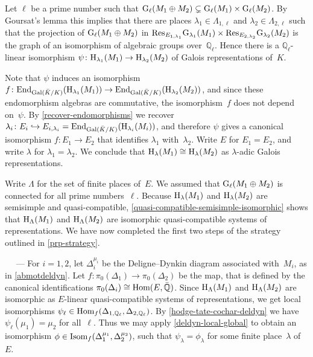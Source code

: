 \documentclass[10pt,twoside,leqno]{article}
\renewcommand{\paragraph}[1]{\par\bigskip\refstepcounter{subsection}%
 {\normalfont\normalsize\scshape\noindent\thesubsection%
 \ifthenelse{\equal{#1}{}}%
 {}%
 {\ \textls{#1.}}%
 \ ---}%
}
\numberwithin{equation}{subsection}
\newcommand{\into}{\hookrightarrow}
\newcommand{\Hom}{\textnormal{Hom}}
\newcommand{\End}{\textnormal{End}}
\newcommand{\Isom}{\textnormal{Isom}}
\newcommand{\QQ}{\mathbb{Q}}
\newcommand{\QQbar}{\bar{\QQ}}
\newcommand{\QQl}{\QQ_{\ell}}
\newcommand{\Gal}{\textnormal{Gal}}
\newcommand{\HH}{\textnormal{H}}
\newcommand{\Hlambda}{\HH_{\lambda}}
\newcommand{\HLambda}{\HH_{\Lambda}}
\newcommand{\GG}{\textnormal{G}}
\newcommand{\Gl}{\GG_{\ell}}
\newcommand{\Res}{\textnormal{Res}}
\begin{document}
Let $\ell$ be a prime number
such that $\Gl(M_1 \oplus M_2) \subsetneq \Gl(M_1) \times \Gl(M_2)$.
By Goursat's lemma this implies that there are
places $\lambda_1 \in \Lambda_{1,\ell}$
and $\lambda_2 \in \Lambda_{2,\ell}$
such that the projection of $\Gl(M_1 \oplus M_2)$ in
$\Res_{E_{1,\lambda_1}} \GG_{\lambda_1}(M_1) \times
\Res_{E_{2,\lambda_2}} \GG_{\lambda_2}(M_2)$
is the graph of an isomorphism of algebraic groups over~$\QQl$.
Hence there is a $\QQl$-linear isomorphism %
$\psi \colon \HH_{\lambda_1}(M_1) \to \HH_{\lambda_2}(M_2)$
of Galois representations of~$K$.

Note that $\psi$ induces an isomorphism
$f \colon \End_{\Gal(\bar{K}/K)}(\HH_{\lambda_1}(M_1)) \to
\End_{\Gal(\bar{K}/K)}(\HH_{\lambda_2}(M_2))$,
and since these endomorphism algebras are commutative,
the isomorphism~$f$ does not depend on~$\psi$.
By \cref{recover-endomorphisms} we recover
$\lambda_i \colon E_i \into E_{i,\lambda_i} =
\End_{\Gal(\bar{K}/K)}(\HH_{\lambda_i}(M_i))$,
and therefore $\psi$ gives a canonical isomorphism
$f \colon E_1 \to E_2$ that identifies $\lambda_1$ with~$\lambda_2$.
Write $E$ for $E_1 = E_2$,
and write $\lambda$ for $\lambda_1 = \lambda_2$.
We conclude that $\Hlambda(M_1) \cong \Hlambda(M_2)$
as $\lambda$-adic Galois representations.

Write $\Lambda$ for the set of finite places of~$E$.
We assumed that $\Gl(M_{1} \oplus M_{2})$
is connected for all prime numbers~$\ell$.
Because $\Hlambda(M_1)$ and $\Hlambda(M_2)$
are semisimple and quasi-compatible,
\cref{quasi-compatible-semisimple-isomorphic}
shows that $\HLambda(M_1)$ and $\HLambda(M_2)$
are isomorphic quasi-compatible systems of representations.
We have now completed the first two steps of the strategy
outlined in \cref{prp-strategy}.

\paragraph{} %
For $i = 1,2$, let $\Delta_i^{\mu_i}$
be the Deligne--Dynkin diagram associated with~$M_i$,
as in \cref{abmotdeldyn}.
Let $f \colon \pi_0(\Delta_1) \to \pi_0(\Delta_2)$ be the map,
that is defined by the canonical identifications
$\pi_0(\Delta_i) \cong \Hom(E,\QQbar)$.
Since $\HLambda(M_1)$ and $\HLambda(M_2)$ are isomorphic
as $E$-linear quasi-compatible systems of representations,
we get local isomorphisms
$\psi_\ell \in \Hom_f(\Delta_{1,\QQl},\Delta_{2,\QQl})$.
By \cref{hodge-tate-cochar-deldyn} we have
$\psi_\ell(\mu_1) = \mu_2$ for all~$\ell$.
Thus we may apply \cref{deldyn-local-global}
to obtain an isomorphism $\phi \in \Isom_f(\Delta_1^{\mu_1},\Delta_2^{\mu_2})$,
such that $\psi_\lambda = \phi_\lambda$ for some finite place~$\lambda$ of~$E$.
\end{document}
